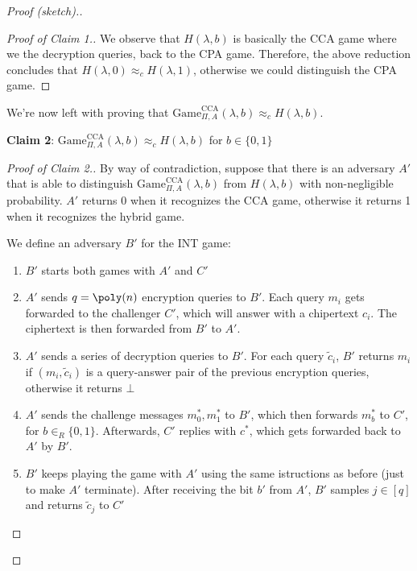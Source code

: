 \documentclass[a4paper, 12pt]{report}
\begin{document}
\begin{proof}[Proof (sketch).]
\begin{proof}[Proof of Claim 1.]
            We observe that $H(\lambda, b)$ is basically the CCA game where we  the decryption queries,  back to the CPA game. Therefore, the above reduction concludes that $H(\lambda, 0) \approx_c H(\lambda,1)$, otherwise we could distinguish the CPA game.
        \end{proof}

        We're now left with proving that $\mathrm{Game}_{\Pi,A}^{\text{CCA}}(\lambda, b) \approx_c H(\lambda, b)$.

        \textbf{Claim 2}: $\mathrm{Game}_{\Pi,A}^{\text{CCA}}(\lambda, b) \approx_c H(\lambda, b)$ for $b \in \{0,1\}$

        \begin{proof}[Proof of Claim 2.]
            By way of contradiction, suppose that there is an adversary $A'$ that is able to distinguish $\mathrm{Game}_{\Pi, A}^{\text{CCA}}(\lambda, b)$ from $H(\lambda, b)$ with non-negligible probability. $A'$ returns 0 when it recognizes the CCA game, otherwise it returns 1 when it recognizes the hybrid game.
            
            We define an adversary $B'$ for the INT game:
            \begin{enumerate}
                \item $B'$ starts both games with $A'$ and $C'$
                \item $A'$ sends $q = \poly(n)$ encryption queries to $B'$. Each query $m_i$ gets forwarded to the challenger $C'$, which will answer with a chipertext $c_i$. The ciphertext is then forwarded from $B'$ to $A'$.
                \item $A'$ sends a series of decryption queries to $B'$. For each query $\widetilde c_i$, $B'$ returns $m_i$ if $(m_i, \widetilde c_i)$ is a query-answer pair of the previous encryption queries, otherwise it returns $\bot$
                \item $A'$ sends the challenge messages $m_0^*, m_1^*$ to $B'$, which then forwards $m_b^*$ to $C'$, for $b \in_R \{0,1\}$. Afterwards, $C'$ replies with $c^*$, which gets forwarded back to $A'$ by $B'$.
                \item $B'$ keeps playing the game with $A'$ using the same istructions as before (just to make $A'$ terminate). After receiving the bit $b'$ from $A'$, $B'$ samples $j \in [q]$ and returns $\widetilde c_j$ to $C'$ 
            \end{enumerate}
            

\end{proof}
\end{proof}
\end{document}
